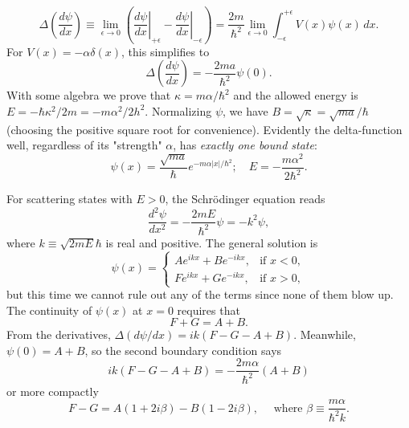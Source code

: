 \documentclass{article}
\begin{document}
\begin{equation} \label{eq:dir-del-bou-4}
  \Delta\left(\frac{d\psi}{dx}\right)
  \equiv \lim_{\epsilon \to 0}\left(
    \left.\frac{d\psi}{dx}\right|_{+\epsilon}
    - \left.\frac{d\psi}{dx}\right|_{-\epsilon}
  \right)
  = \frac{2m}{\hbar^2}\lim_{\epsilon \to 0}
    \int_{-\epsilon}^{+\epsilon} V(x)\psi(x) \,dx.
\end{equation}
For $V(x) = -\alpha\delta(x)$, this simplifies to
\begin{equation} \label{eq:dir-del-bou-5}
  \Delta\left(\frac{d\psi}{dx}\right)
  = -\frac{2ma}{\hbar^2}\psi(0).
\end{equation}
With some algebra we prove that $\kappa = m\alpha/\hbar^2$ and the allowed
energy is $E = -\hbar\kappa^2/2m = -m\alpha^2/2h^2$. Normalizing $\psi$, we
have $B = \sqrt{\kappa} = \sqrt{ma}/\hbar$ (choosing the positive square root
for convenience). Evidently the delta-function well, regardless of its
"strength" $\alpha$, has \emph{exactly one bound state}:
\begin{equation} \label{eq:dir-del-bou}
  \boxed{
    \psi(x) = \frac{\sqrt{ma}}{\hbar}e^{-m\alpha|x|/\hbar^2};
    \quad E = -\frac{m\alpha^2}{2\hbar^2}.
  }
\end{equation}

For scattering states with $E > 0$, the Schr\"{o}dinger equation reads
\begin{equation} \label{eq:dir-del-sca-1}
  \frac{d^2\psi}{dx^2} = -\frac{2mE}{\hbar^2}\psi = -k^2\psi,
\end{equation}
where $k \equiv \sqrt{2mE}{\hbar}$ is real and positive. The general solution
is
\begin{equation} \label{eq:dir-del-sca-2}
  \psi(x) =
  \begin{cases}
    Ae^{ikx} + Be^{-ikx}, &\text{if } x < 0, \\
    Fe^{ikx} + Ge^{-ikx}, &\text{if } x > 0,
  \end{cases}
\end{equation}
but this time we cannot rule out any of the terms since none of them blow up.
The continuity of $\psi(x)$ at $x = 0$ requires that
\begin{equation} \label{eq:dir-del-sca-3a}
  F + G = A + B.
\end{equation}
From the derivatives, $\Delta(d\psi/dx) = ik(F - G - A + B)$. Meanwhile,
$\psi(0) = A + B$, so the second boundary condition says \[
  ik(F - G - A + B) = -\frac{2m\alpha}{\hbar^2}(A + B)
\] or more compactly
\begin{equation} \label{eq:dir-del-sca-3b}
  F - G = A(1 + 2i\beta) - B(1 - 2i\beta),
  \quad \text{ where } \beta \equiv \frac{m\alpha}{\hbar^2k}.
\end{equation}
\end{document}
